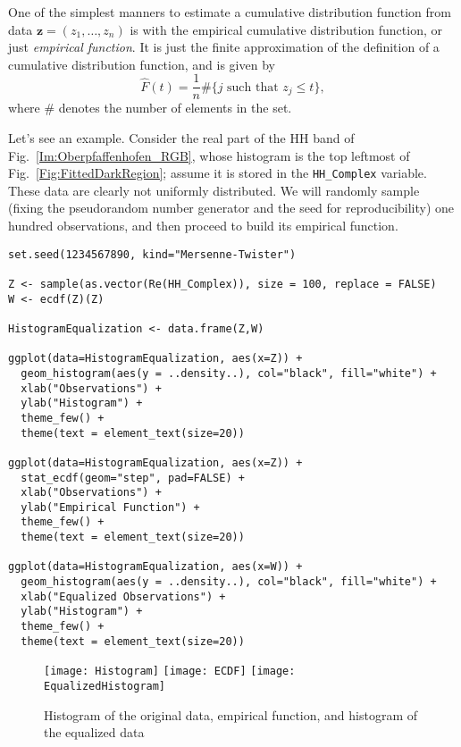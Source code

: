One of the simplest manners to estimate a cumulative distribution function from data $\bm z=(z_1,\dots,z_n)$ is with the empirical cumulative distribution function, or just \textit{empirical function}.
It is just the finite approximation of the definition of a cumulative distribution function, and is given by
\begin{equation}
\widehat{F}(t) = \frac1n \#\{j \text{ such that } z_j\leq t\} ,
\end{equation}
where $\#$ denotes the number of elements in the set.

Let's see an example.
Consider the real part of the HH band of Fig.~\ref{Im:Oberpfaffenhofen_RGB}, whose histogram is the top leftmost of Fig.~\ref{Fig:FittedDarkRegion}; assume it is stored in the \verb|HH_Complex| variable.
These data are clearly not uniformly distributed.
We will randomly sample (fixing the pseudorandom number generator and the seed for reproducibility) one hundred observations, and then proceed to build its empirical function.

\begin{lstlisting}
set.seed(1234567890, kind="Mersenne-Twister")

Z <- sample(as.vector(Re(HH_Complex)), size = 100, replace = FALSE)
W <- ecdf(Z)(Z)

HistogramEqualization <- data.frame(Z,W)
 
ggplot(data=HistogramEqualization, aes(x=Z)) +
  geom_histogram(aes(y = ..density..), col="black", fill="white") +
  xlab("Observations") +
  ylab("Histogram") + 
  theme_few() +
  theme(text = element_text(size=20))

ggplot(data=HistogramEqualization, aes(x=Z)) +
  stat_ecdf(geom="step", pad=FALSE) +
  xlab("Observations") +
  ylab("Empirical Function") + 
  theme_few() +
  theme(text = element_text(size=20))

ggplot(data=HistogramEqualization, aes(x=W)) +
  geom_histogram(aes(y = ..density..), col="black", fill="white") +
  xlab("Equalized Observations") +
  ylab("Histogram") + 
  theme_few() +
  theme(text = element_text(size=20))
\end{lstlisting}

\begin{figure*}[hbt]
\centering
\texttt{[image: Histogram]}
\texttt{[image: ECDF]}
\texttt{[image: EqualizedHistogram]}
\caption{Histogram of the original data, empirical function, and histogram of the equalized data}
\end{figure*}

